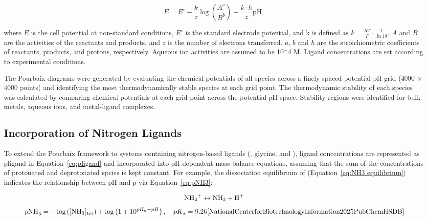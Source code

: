 \documentclass[journal=jacsat,manuscript=article]{achemso}
\begin{document}
\begin{equation} \label{eq:nernst} E = E^\circ - \frac{k}{z} \log \left(\frac{A^a}{B^b}\right) - \frac{k \cdot h}{z} \text{pH}, \end{equation}

where \(E\) is the cell potential at non-standard conditions, \(E^\circ\) is the standard electrode potential, and k is defined as \(k = \frac{RT}{F} \cdot \frac{1}{\ln 10}\). \(A\) and \(B\) are the activities of the reactants and products, and \(z\) is the number of electrons transferred. \(a\), \(b\) and \(h\) are the stroichiometric coefficients of reactants, products, and protons, respectively. Aqueous ion activities are assumed to be 10$^-4$ M. Ligand concentrations are set according to experimental conditions. 

The Pourbaix diagrams were generated by evaluating the chemical potentials of all species across a finely spaced potential-pH grid (4000 $\times$ 4000 points) and identifying the most thermodynamically stable species at each grid point. The thermodynamic stability of each species was calculated by comparing chemical potentials at each grid point across the potential-pH space. Stability regions were identified for bulk metals, aqueous ions, and metal-ligand complexes. 


\subsection{Incorporation of Nitrogen Ligands}
To extend the Pourbaix framework to systems containing nitrogen-based ligands (, glycine, and ), ligand concentrations are represented as pligand in Equation~\eqref{eq:pligand} and incorporated into pH-dependent mass balance equations, assuming that the sum of the concentrations of protonated and deprotonated spcies is kept constant. For example, the dissociation equilibrium of  (Equation~\eqref{eq:NH3 equilibrium}) indicates the relationship between pH and p via Equation~\eqref{eq:pNH3}:

\begin{equation} \label{eq:NH3 equilibrium}
\ce{NH4+} \leftrightarrow \ce{NH3} + \ce{H+}
\end{equation}
\begin{equation} \label{eq:pNH3}
\text{pNH}_3 = -\log \left([\text{NH}_3]_{\text{tot}}\right) + \log \left(1 + 10^{pK_a - pH} \right), \quad pK_a = 9.26 \cite{NationalCenterforBiotechnologyInformation2025PubChemHSDB}
\end{equation}
\end{document}
